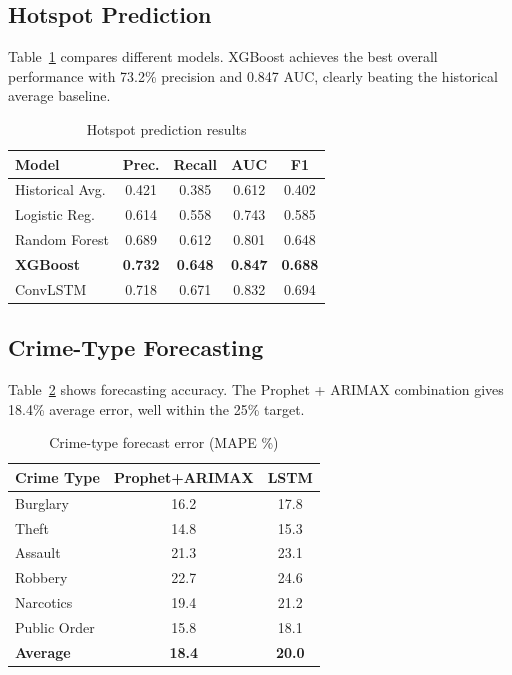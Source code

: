 \documentclass[a4paper,10pt,twocolumn]{article}
\begin{document}
\subsection{Hotspot Prediction}

Table~\ref{tab:hotspot} compares different models. XGBoost achieves the best overall performance with 73.2\% precision and 0.847 AUC, clearly beating the historical average baseline.

\begin{table}[H]
\centering
\caption{Hotspot prediction results}
\label{tab:hotspot}
\begin{tabular}{@{}lcccc@{}}
\toprule
\textbf{Model} & \textbf{Prec.} & \textbf{Recall} & \textbf{AUC} & \textbf{F1} \\
\midrule
Historical Avg. & 0.421 & 0.385 & 0.612 & 0.402 \\
Logistic Reg. & 0.614 & 0.558 & 0.743 & 0.585 \\
Random Forest & 0.689 & 0.612 & 0.801 & 0.648 \\
\textbf{XGBoost} & \textbf{0.732} & \textbf{0.648} & \textbf{0.847} & \textbf{0.688} \\
ConvLSTM & 0.718 & 0.671 & 0.832 & 0.694 \\
\bottomrule
\end{tabular}
\end{table}

\subsection{Crime-Type Forecasting}

Table~\ref{tab:forecast} shows forecasting accuracy. The Prophet + ARIMAX combination gives 18.4\% average error, well within the 25\% target.

\begin{table}[H]
\centering
\caption{Crime-type forecast error (MAPE \%)}
\label{tab:forecast}
\begin{tabular}{@{}lcc@{}}
\toprule
\textbf{Crime Type} & \textbf{Prophet+ARIMAX} & \textbf{LSTM} \\
\midrule
Burglary & 16.2 & 17.8 \\
Theft & 14.8 & 15.3 \\
Assault & 21.3 & 23.1 \\
Robbery & 22.7 & 24.6 \\
Narcotics & 19.4 & 21.2 \\
Public Order & 15.8 & 18.1 \\
\midrule
\textbf{Average} & \textbf{18.4} & \textbf{20.0} \\
\bottomrule
\end{tabular}
\end{table}
\end{document}
